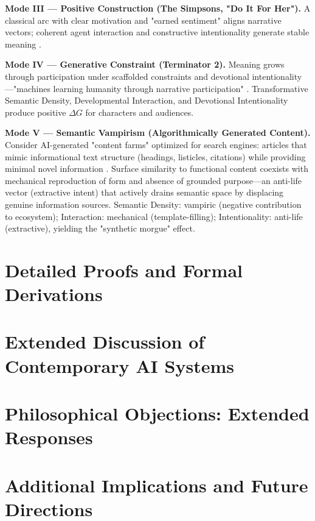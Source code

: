 \documentclass[12pt]{article}
\begin{document}
\textbf{Mode III — Positive Construction (The Simpsons, "Do It For Her").} A classical arc with clear motivation and "earned sentiment" aligns narrative vectors; coherent agent interaction and constructive intentionality generate stable meaning \citep{groening1993simpsons}.

\textbf{Mode IV — Generative Constraint (Terminator 2).} Meaning grows through participation under scaffolded constraints and devotional intentionality—"machines learning humanity through narrative participation" \citep{cameron1991terminator}. Transformative Semantic Density, Developmental Interaction, and Devotional Intentionality produce positive $\Delta G$ for characters and audiences.

\textbf{Mode V — Semantic Vampirism (Algorithmically Generated Content).} Consider AI-generated "content farms" optimized for search engines: articles that mimic informational text structure (headings, listicles, citations) while providing minimal novel information \citep{goldstein2023generative}. Surface similarity to functional content coexists with mechanical reproduction of form and absence of grounded purpose—an anti-life vector (extractive intent) that actively drains semantic space by displacing genuine information sources. Semantic Density: vampiric (negative contribution to ecosystem); Interaction: mechanical (template-filling); Intentionality: anti-life (extractive), yielding the "synthetic morgue" effect.

\section{Detailed Proofs and Formal Derivations}

\section{Extended Discussion of Contemporary AI Systems}

\section{Philosophical Objections: Extended Responses}

\section{Additional Implications and Future Directions}
\end{document}
